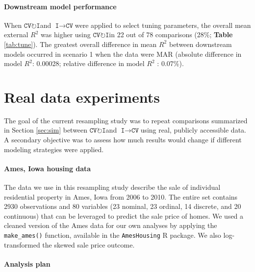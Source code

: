\documentclass[AMA,STIX1COL,doublespace]{WileyNJD-v2}
\begin{document}
\paragraph{Downstream model performance}

When $\texttt{CV}\!\circlearrowright\!\texttt{I}$\space and
$\texttt{I}\!\!\rightarrow\!\texttt{CV}$\space were applied to select
tuning parameters, the overall mean external \(R^2\) was higher using
$\texttt{CV}\!\circlearrowright\!\texttt{I}$\space in 22 out of 78
comparisons (28\%; \textbf{Table} \ref{tab:tune}). The greatest overall
difference in mean \(R^2\) between downstream models occurred in
scenario 1 when the data were MAR (absolute difference in model \(R^2\):
0.00028; relative difference in model \(R^2\) : 0.07\%).

\section{Real data experiments} \label{sec:app}

The goal of the current resampling study was to repeat comparisons
summarized in Section \ref{sec:sim} between
$\texttt{CV}\!\circlearrowright\!\texttt{I}$\space and
$\texttt{I}\!\!\rightarrow\!\texttt{CV}$\space using real, publicly
accessible data. A secondary objective was to assess how much results
would change if different modeling strategies were applied.

\paragraph{Ames, Iowa housing data}

The data we use in this resampling study describe the sale of individual
residential property in Ames, Iowa from 2006 to 2010. The entire set
contains 2930 observations and 80 variables (23 nominal, 23 ordinal, 14
discrete, and 20 continuous) that can be leveraged to predict the sale
price of homes.\cite{de2011ames} We used a cleaned version of the Ames
data for our own analyses by applying the \texttt{make\_ames()}
function, available in the \texttt{AmesHousing} R
package.\cite{AmesHousing} We also log-transformed the skewed sale price
outcome.

\paragraph{Analysis plan}
\end{document}
